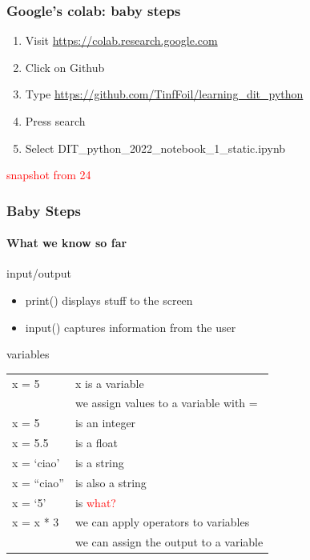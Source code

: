 \documentclass{beamer}
\newcommand{\red}[1]{\textcolor{red}{#1}}
\begin{document}
\begin{frame}
\frametitle{Google’s colab: baby steps}

\begin{enumerate}
\item Visit \url{https://colab.research.google.com}
\medskip

\item Click on Github
\medskip

\item Type \url{https://github.com/TinfFoil/learning_dit_python}
\medskip

\item Press search
\medskip

\item Select \alert{DIT\_python\_2022\_notebook\_1\_static.ipynb}
\end{enumerate}

\red{snapshot from 24}
\end{frame}

\begin{frame}
\frametitle{Baby Steps}
\framesubtitle{What we know so far}

\alert{input/output}

\begin{itemize}
\item print() displays stuff to the screen
\item input() captures information from the user
\end{itemize}										\pause 

\alert{variables}
\medskip

\centering
\begin{tabular}{ll}\hline
x = 5		& x is a variable	\\
			& we assign values to a variable with = 	\\\hline	\pause 

x = 5		& is an integer	\\
x = 5.5		& is a float	\\
x = ‘ciao’	& is a string	\\
x = “ciao”	& is also a string	\\
x = ‘5’		& is \red{what?}	\\				\hline	\pause 
 
x  = x * 3	& we can apply operators to variables	\\
			& we can assign the output to a variable	\\	\hline

\end{tabular}
\end{frame}
\end{document}
